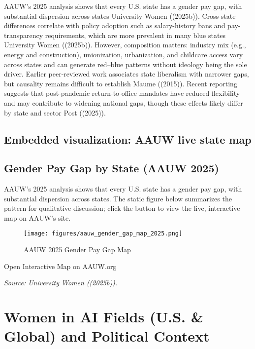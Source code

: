 \documentclass[
  letterpaper,
  DIV=11,
  numbers=noendperiod]{scrartcl}
\begin{document}
AAUW's 2025 analysis shows that every U.S. state has a gender pay gap,
with substantial dispersion across states University Women ((2025b)).
Cross-state differences correlate with policy adoption such as
salary-history bans and pay-transparency requirements, which are more
prevalent in many blue states University Women ((2025b)). However,
composition matters: industry mix (e.g., energy and construction),
unionization, urbanization, and childcare access vary across states and
can generate red--blue patterns without ideology being the sole driver.
Earlier peer-reviewed work associates state liberalism with narrower
gaps, but causality remains difficult to establish Maume ((2015)).
Recent reporting suggests that post-pandemic return-to-office mandates
have reduced flexibility and may contribute to widening national gaps,
though these effects likely differ by state and sector Post ((2025)).

\subsection{Embedded visualization: AAUW live state
map}\label{embedded-visualization-aauw-live-state-map}

\subsection{Gender Pay Gap by State (AAUW
2025)}\label{gender-pay-gap-by-state-aauw-2025}

AAUW's 2025 analysis shows that every U.S. state has a gender pay gap,
with substantial dispersion across states. The static figure below
summarizes the pattern for qualitative discussion; click the button to
view the live, interactive map on AAUW's site.

\begin{figure}[H]

{\centering \texttt{[image: figures/aauw\_gender\_gap\_map\_2025.png]}

}

\caption{AAUW 2025 Gender Pay Gap Map}

\end{figure}%

Open Interactive Map on AAUW.org

\emph{Source: University Women ((2025b)).}

\section{Women in AI Fields (U.S. \& Global) and Political
Context}\label{women-in-ai-fields-u.s.-global-and-political-context}
\end{document}
